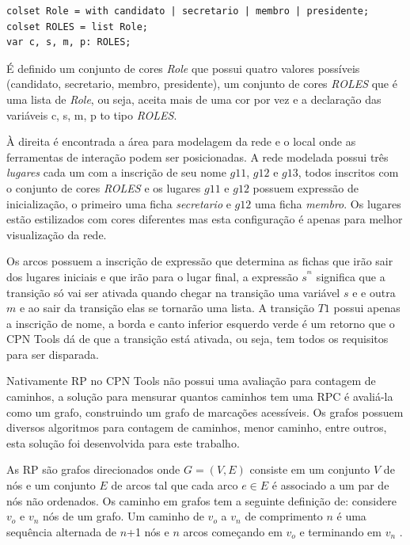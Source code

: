 \begin{lstlisting}
colset Role = with candidato | secretario | membro | presidente;
colset ROLES = list Role;
var c, s, m, p: ROLES;
\end{lstlisting}

É definido um conjunto de cores \textit{Role} que possui quatro valores possíveis (candidato, secretario, membro, presidente), um conjunto de cores \textit{ROLES} que é uma lista de \textit{Role}, ou seja, aceita mais de uma cor por vez e a declaração das variáveis c, s, m, p to tipo \textit{ROLES}.

À direita é encontrada a área para modelagem da rede e o local onde as ferramentas de interação podem ser posicionadas. A rede modelada possui três \textit{lugares} cada um com a inscrição de seu nome $g11$, $g12$ e $g13$, todos  inscritos com o conjunto de cores \textit{ROLES} e os lugares $g11$ e $g12$ possuem expressão de inicialização, o primeiro uma ficha \textit{secretario} e $g12$ uma ficha \textit{membro}. Os lugares estão estilizados com cores diferentes mas esta configuração é apenas para melhor visualização da rede.

Os arcos possuem a inscrição de expressão que determina as fichas que irão sair dos lugares iniciais e que irão para o lugar final, a expressão $s^^m$ significa que a transição só vai ser ativada quando chegar na transição uma variável $s$ e e outra $m$ e ao sair da transição elas se tornarão uma lista. A transição $T1$ possui apenas a inscrição de nome, a borda e canto inferior esquerdo verde é um retorno que o CPN Tools dá de que a transição está ativada, ou seja, tem todos os requisitos para ser disparada.

Nativamente RP no CPN Tools não possui uma avaliação para contagem de caminhos, a solução para mensurar quantos caminhos tem uma RPC é avaliá-la como um grafo, construindo um grafo de marcações acessíveis. Os grafos possuem diversos algoritmos para contagem de caminhos, menor caminho, entre outros, esta solução foi desenvolvida para este trabalho. 

As RP são grafos direcionados onde $G = (V, E)$ consiste em um conjunto $V$ de nós e um conjunto $E$ de arcos tal que cada arco $e \in E$ é associado a um par de nós não ordenados. Os caminho em grafos tem a seguinte definição de: considere $v_{o}$ e $v_{n}$ nós de um grafo. Um caminho de $v_{o}$ a $v_{n}$ de comprimento $n$ é uma sequência alternada de $n$+1 nós e $n$ arcos começando em $v_{o}$ e terminando em $v_{n}$ \cite{cardoso1997redes}.
